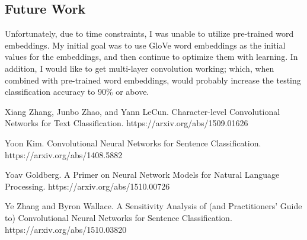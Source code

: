 \documentclass{article}
\begin{document}
\subsection{Future Work}
Unfortunately, due to time constraints, I was unable to utilize pre-trained word embeddings. My initial goal was to use GloVe word embeddings as
the initial values for the embeddings, and then continue to optimize them with learning. In addition, I would like to get
multi-layer convolution working; which, when combined with pre-trained word embeddings, would probably increase the testing classification accuracy
to 90\% or above.

\begin{thebibliography}{9}

Xiang Zhang, Junbo Zhao, and Yann LeCun.  Character-level Convolutional Networks for Text Classification.
https://arxiv.org/abs/1509.01626

Yoon Kim.  Convolutional Neural Networks for Sentence Classification.
https://arxiv.org/abs/1408.5882

Yoav Goldberg. A Primer on Neural Network Models for Natural Language Processing.
https://arxiv.org/abs/1510.00726

Ye Zhang and Byron Wallace. A Sensitivity Analysis of (and Practitioners' Guide to) Convolutional Neural Networks for Sentence Classification.
https://arxiv.org/abs/1510.03820

\end{thebibliography}
\end{document}
